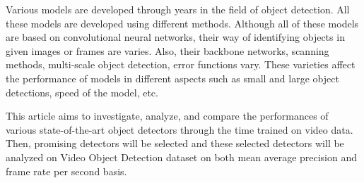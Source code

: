 \documentclass{article}
\begin{document}
\setlength{\parindent}{6ex}

\indent

Various models are developed through years in the field of object detection. 
All these models are developed using different methods. Although all of these
models are based on convolutional neural networks, their way of identifying objects
in given images or frames are varies. Also, their backbone networks, scanning methods, 
multi-scale object detection, error functions vary. These varieties affect the 
performance of models in different aspects such as small and large object detections,
speed of the model, etc. \par

This article aims to investigate, analyze, and compare the performances of
various state-of-the-art object detectors through the time trained on video data. Then, 
promising detectors will be selected and these selected detectors will be analyzed on
Video Object Detection dataset on both mean average precision and frame rate per second 
basis. 
\end{document}
